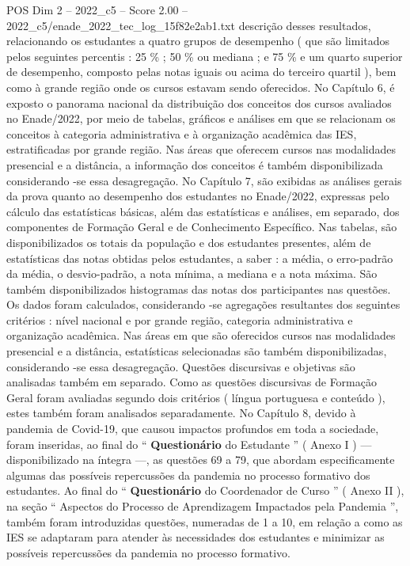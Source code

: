\begin{textsample}{POS Dim 2 – 2022\_c5 – Score 2.00 – 2022\_c5/enade\_2022\_tec\_log\_15f82e2ab1.txt}  \label{ex:f2_pos_215}
descrição desses resultados, relacionando os estudantes a quatro grupos de desempenho ( que são limitados pelos seguintes percentis : 25 \% ; 50 \% ou mediana ; e 75 \% e um quarto superior de desempenho, composto pelas notas iguais ou acima do terceiro quartil ), bem como à grande região onde os cursos estavam sendo oferecidos.
No Capítulo 6, é exposto o panorama nacional da distribuição dos conceitos dos cursos avaliados no Enade/2022, por meio de tabelas, gráficos e análises em que se relacionam os conceitos à categoria administrativa e à organização acadêmica das IES, estratificadas por grande região.
Nas áreas que oferecem cursos nas modalidades presencial e a distância, a informação dos conceitos é também disponibilizada considerando -se essa desagregação.
No Capítulo 7, são exibidas as análises gerais da prova quanto ao desempenho dos estudantes no Enade/2022, expressas pelo cálculo das estatísticas básicas, além das estatísticas e análises, em separado, dos componentes de Formação Geral e de Conhecimento Específico.
Nas tabelas, são disponibilizados os totais da população e dos estudantes presentes, além de estatísticas das notas obtidas pelos estudantes, a saber : a média, o erro-padrão da média, o desvio-padrão, a nota mínima, a mediana e a nota máxima.
São também disponibilizados histogramas das notas dos participantes nas questões.
Os dados foram calculados, considerando -se agregações resultantes dos seguintes critérios : nível nacional e por grande região, categoria administrativa e organização acadêmica.
Nas áreas em que são oferecidos cursos nas modalidades presencial e a distância, estatísticas selecionadas são também disponibilizadas, considerando -se essa desagregação.
Questões discursivas e objetivas são analisadas também em separado.
Como as questões discursivas de Formação Geral foram avaliadas segundo dois critérios ( língua portuguesa e conteúdo ), estes também foram analisados separadamente.
No Capítulo 8, devido à pandemia de Covid-19, que causou impactos profundos em toda a sociedade, foram inseridas, ao final do “ \textbf{Questionário} do Estudante ” ( Anexo I ) — disponibilizado na íntegra —, as questões 69 a 79, que abordam especificamente algumas das possíveis repercussões da pandemia no processo formativo dos estudantes.
Ao final do “ \textbf{Questionário} do Coordenador de Curso ” ( Anexo II ), na seção “ Aspectos do Processo de Aprendizagem Impactados pela Pandemia ”, também foram introduzidas questões, numeradas de 1 a 10, em relação a como as IES se adaptaram para atender às necessidades dos estudantes e minimizar as possíveis repercussões da pandemia no processo formativo.

\end{textsample}
